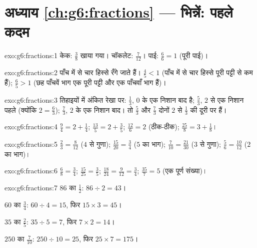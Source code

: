 \section*{अध्याय \ref{ch:g6:fractions} --- भिन्नें: पहले कदम}

\begin{solution}{exo:g6:fractions:1}
केक: $\frac38$ खाया गया। \quad चॉकलेट: $\frac{7}{12}$। \quad
पाई: $\frac66 = 1$ (पूरी पाई)।
\end{solution}

\begin{solution}{exo:g6:fractions:2}
पाँच में से चार हिस्से रँगे जाते हैं। $\frac45 < 1$ (पाँच में से
चार हिस्से पूरी पट्टी से कम हैं); $\frac65 > 1$ (छह पाँचवें भाग
एक पूरी पट्टी और एक पाँचवाँ भाग हैं)।
\end{solution}

\begin{solution}{exo:g6:fractions:3}
तिहाइयों में अंकित रेखा पर: $\frac13$, $0$ के एक निशान बाद है;
$\frac53$, $2$ से एक निशान पहले (क्योंकि $2 = \frac63$);
$\frac73$, $2$ के एक निशान बाद। तो $\frac53$ और $\frac73$ दोनों
$2$ से $\frac13$ की दूरी पर हैं।
\end{solution}

\begin{solution}{exo:g6:fractions:4}
$\frac94 = 2 + \frac14$; \quad
$\frac{13}{5} = 2 + \frac35$; \quad
$\frac{12}{6} = 2$ (ठीक-ठीक); \quad
$\frac{25}{8} = 3 + \frac18$।
\end{solution}

\begin{solution}{exo:g6:fractions:5}
$\frac23 = \frac{8}{12}$ ($4$ से गुणा); \quad
$\frac{15}{20} = \frac34$ ($5$ का भाग); \quad
$\frac{7}{10} = \frac{21}{30}$ ($3$ से गुणा); \quad
$\frac56 = \frac{10}{12}$ ($2$ का भाग)।
\end{solution}

\begin{solution}{exo:g6:fractions:6}
$\frac68 = \frac34$; \quad
$\frac{15}{25} = \frac35$; \quad
$\frac{18}{24} = \frac{9}{12} = \frac34$; \quad
$\frac{35}{7} = 5$ (एक पूर्ण संख्या)।
\end{solution}

\begin{solution}{exo:g6:fractions:7}
$86$ का $\frac12$: $86 \div 2 = 43$।

$60$ का $\frac34$: $60 \div 4 = 15$, फिर $15 \times 3 = 45$।

$35$ का $\frac25$: $35 \div 5 = 7$, फिर $7 \times 2 = 14$।

$250$ का $\frac{7}{10}$: $250 \div 10 = 25$, फिर $25 \times 7 = 175$।
\end{solution}

